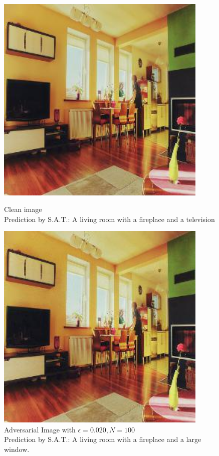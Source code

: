 \begin{figure}[ht]
    \centering
    \begin{minipage}{0.45\textwidth}
        \centering
        \includegraphics[width=0.9\textwidth]{figures/Distract/n=100/samples/0.000/img_0.jpg} %
        \caption*{Clean image\\Prediction by S.A.T.: A living room with a fireplace and a television}
    \end{minipage}\hfill
    \begin{minipage}{0.45\textwidth}
        \centering
        \includegraphics[width=0.9\textwidth]{figures/Distract/n=100/samples/0.020/img_0.jpg} %
        \caption*{Adversarial Image with $\epsilon=0.020, N=100$\\Prediction by S.A.T.: A living room with a fireplace and a large window.}
    \end{minipage}
\end{figure}

